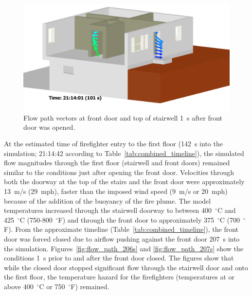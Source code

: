 \documentclass[12pt,oneside]{book}
\begin{document}
\begin{figure}[!ht]
\includegraphics[trim = 2.5in 0in 4in 0in, clip=true, width=.65\textwidth]{../Figures/flow_vector_101s}


\caption[Flow path vectors at front door and top of stairwell 1~s after front door was opened]
{Flow path vectors at front door and top of stairwell 1~s after front door was opened.}
\label{fig:flow_path_101s} 
\end{figure}

\clearpage

At the estimated time of firefighter entry to the first floor (142~s into the simulation; 21:14:42 according to Table~\ref{tab:combined_timeline}), the simulated flow magnitudes through the first floor (stairwell and front doors) remained similar to the conditions just after opening the front door. Velocities through both the doorway at the top of the stairs and the front door were approximately 13~m/s (29~mph), faster than the imposed wind speed (9~m/s or 20~mph) because of the addition of the buoyancy of the fire plume. The model temperatures increased through the stairwell doorway to between 400~$^{\circ}$C and 425~$^{\circ}$C (750-800~$^{\circ}$F) and through the front door to approximately 375~$^{\circ}$C (700~$^{\circ}$F). From the approximate timeline (Table~\ref{tab:combined_timeline}), the front door was forced closed due to airflow pushing against the front door 207~s into the simulation. Figures~\ref{fig:flow_path_206s} and \ref{fig:flow_path_207s} show the conditions 1~s prior to and after the front door closed. The figures show that while the closed door stopped significant flow through the stairwell door and onto the first floor, the temperature hazard for the firefighters (temperatures at or above 400~$^{\circ}$C or 750~$^{\circ}$F) remained.
\end{document}
